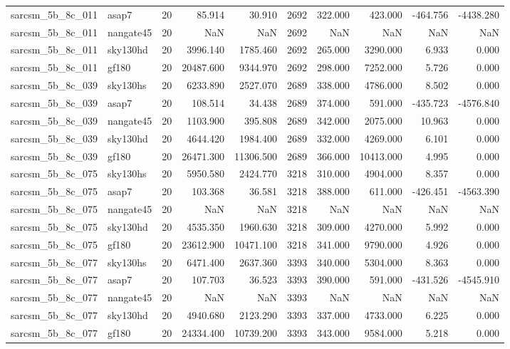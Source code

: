 \begin{longtable}{llrrrrrrrr}
sarcsm\_5b\_8c\_011 & asap7 & 20 & 85.914 & 30.910 & 2692 & 322.000 & 423.000 & -464.756 & -4438.280 \\
sarcsm\_5b\_8c\_011 & nangate45 & 20 & NaN & NaN & 2692 & NaN & NaN & NaN & NaN \\
sarcsm\_5b\_8c\_011 & sky130hd & 20 & 3996.140 & 1785.460 & 2692 & 265.000 & 3290.000 & 6.933 & 0.000 \\
sarcsm\_5b\_8c\_011 & gf180 & 20 & 20487.600 & 9344.970 & 2692 & 298.000 & 7252.000 & 5.726 & 0.000 \\
sarcsm\_5b\_8c\_039 & sky130hs & 20 & 6233.890 & 2527.070 & 2689 & 338.000 & 4786.000 & 8.502 & 0.000 \\
sarcsm\_5b\_8c\_039 & asap7 & 20 & 108.514 & 34.438 & 2689 & 374.000 & 591.000 & -435.723 & -4576.840 \\
sarcsm\_5b\_8c\_039 & nangate45 & 20 & 1103.900 & 395.808 & 2689 & 342.000 & 2075.000 & 10.963 & 0.000 \\
sarcsm\_5b\_8c\_039 & sky130hd & 20 & 4644.420 & 1984.400 & 2689 & 332.000 & 4269.000 & 6.101 & 0.000 \\
sarcsm\_5b\_8c\_039 & gf180 & 20 & 26471.300 & 11306.500 & 2689 & 366.000 & 10413.000 & 4.995 & 0.000 \\
sarcsm\_5b\_8c\_075 & sky130hs & 20 & 5950.580 & 2424.770 & 3218 & 310.000 & 4904.000 & 8.357 & 0.000 \\
sarcsm\_5b\_8c\_075 & asap7 & 20 & 103.368 & 36.581 & 3218 & 388.000 & 611.000 & -426.451 & -4563.390 \\
sarcsm\_5b\_8c\_075 & nangate45 & 20 & NaN & NaN & 3218 & NaN & NaN & NaN & NaN \\
sarcsm\_5b\_8c\_075 & sky130hd & 20 & 4535.350 & 1960.630 & 3218 & 309.000 & 4270.000 & 5.992 & 0.000 \\
sarcsm\_5b\_8c\_075 & gf180 & 20 & 23612.900 & 10471.100 & 3218 & 341.000 & 9790.000 & 4.926 & 0.000 \\
sarcsm\_5b\_8c\_077 & sky130hs & 20 & 6471.400 & 2637.360 & 3393 & 340.000 & 5304.000 & 8.363 & 0.000 \\
sarcsm\_5b\_8c\_077 & asap7 & 20 & 107.703 & 36.523 & 3393 & 390.000 & 591.000 & -431.526 & -4545.910 \\
sarcsm\_5b\_8c\_077 & nangate45 & 20 & NaN & NaN & 3393 & NaN & NaN & NaN & NaN \\
sarcsm\_5b\_8c\_077 & sky130hd & 20 & 4940.680 & 2123.290 & 3393 & 337.000 & 4733.000 & 6.225 & 0.000 \\
sarcsm\_5b\_8c\_077 & gf180 & 20 & 24334.400 & 10739.200 & 3393 & 343.000 & 9584.000 & 5.218 & 0.000 \\

\end{longtable}
